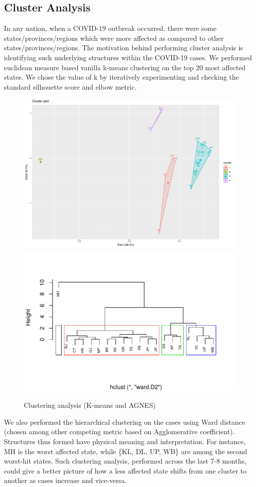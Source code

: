 \documentclass[letterpaper]{article} %
\begin{document}
	\subsection{Cluster Analysis} In any nation, when a COVID-19 outbreak occurred. there were some states/provinces/regions which were more affected as compared to other states/provinces/regions. The motivation behind performing cluster analysis is identifying such underlying structures within the COVID-19 cases. We performed euclidean measure based vanilla k-means clustering on the top 20 most affected states. We chose the value of k by iteratively experimenting and checking the standard silhouette score and elbow metric.
	\begin{figure}[h!]
		\centering
		\includegraphics[width=\linewidth]{cluster}
		\includegraphics[width=\linewidth]{hc}
		\caption{Clustering analysis (K-means and AGNES)}
		\label{fig:cluster}
	\end{figure}
	We also performed  the hierarchical clustering on the cases using Ward distance (chosen among other competing metric based on Agglomerative coefficient). Structures thus formed have physical meaning and interpretation. For instance, MH is the worst affected state, while \{KL, DL, UP, WB\} are among the second worst-hit states. Such clustering analysis, performed across the last 7-8 months, could give a better picture of how a less affected state shifts from one cluster to another as cases increase and vice-versa. 
	
\end{document}
